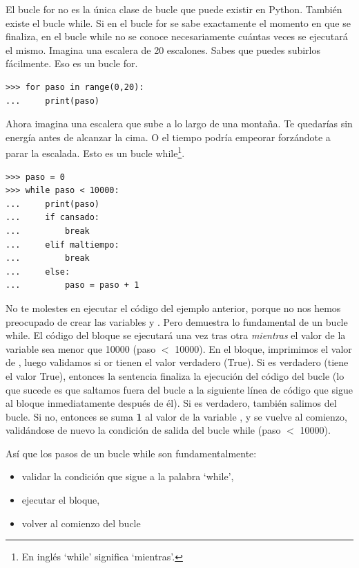 El bucle for no es la única clase de bucle que puede existir en Python. También existe el bucle while. Si en el bucle for se sabe exactamente el momento en que se finaliza, en el bucle while no se conoce necesariamente cuántas veces se ejecutará el mismo. Imagina una escalera de 20 escalones.  Sabes que puedes subirlos fácilmente.  Eso es un bucle for.

\begin{listing}
\begin{verbatim}
>>> for paso in range(0,20):
...     print(paso)
\end{verbatim}
\end{listing}

Ahora imagina una escalera que sube a lo largo de una montaña.  Te quedarías sin energía antes de alcanzar la cima.  O el tiempo podría empeorar forzándote a parar la escalada.  Esto es un bucle while\footnote{En inglés `while' significa `mientras'.}.

\begin{listingignore}
\begin{verbatim}
>>> paso = 0
>>> while paso < 10000:
...     print(paso)
...     if cansado:
...         break
...     elif maltiempo:
...         break
...     else:
...         paso = paso + 1
\end{verbatim}
\end{listingignore}

No te molestes en ejecutar el código del ejemplo anterior, porque no nos hemos preocupado de crear las variables  y .  Pero demuestra lo fundamental de un bucle while.  El código del bloque se ejecutará una vez tras otra \emph{mientras} el valor de la variable  sea menor que 10000 (paso $<$ 10000).  En el bloque, imprimimos el valor de , luego validamos si  or  tienen el valor verdadero (True). Si  es verdadero (tiene el valor True), entonces la sentencia  finaliza la ejecución del código del bucle (lo que sucede es que saltamos fuera del bucle a la siguiente línea de código que sigue al bloque inmediatamente después de él).  Si  es verdadero, también salimos del bucle.  Si no, entonces se suma \textbf{1} al valor de la variable , y se vuelve al comienzo, validándose de nuevo la condición de salida del bucle while (paso $<$ 10000).
\par
\noindent
Así que los pasos de un bucle while son fundamentalmente:

{\renewcommand{\labelitemi}{$\triangleright$}
\begin{itemize}
\item validar la condición que sigue a la palabra `while',
\item ejecutar el bloque,
\item volver al comienzo del bucle
\end{itemize}}

